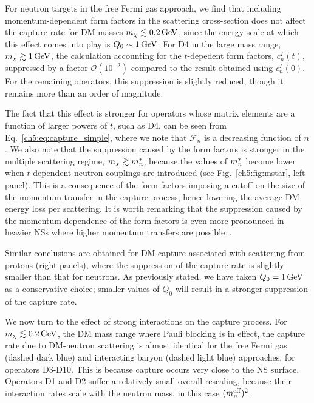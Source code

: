 For neutron targets in the free Fermi gas approach, we find that including momentum-dependent form factors in the scattering cross-section does not affect the capture rate for DM masses $m_\chi\lesssim0.2{\rm \,GeV}$, since the energy scale at which this effect comes into play is $Q_0\sim1{\rm \,GeV}$. For D4 in the large mass range, $m_\chi\gtrsim1{\rm \,GeV}$, the calculation accounting for the $t$-depedent form factors, $c_n^I(t)$, suppressed by a factor $\mathcal{O}(10^{-2})$ compared to the result obtained using $c_n^I(0)$.
For the remaining operators, this suppression is slightly reduced, though it remains more than an order of magnitude.

The fact that this effect is stronger for operators whose matrix elements are a function of larger powers of $t$, such as D4, can be seen from  Eq.~\ref{ch5:eq:capture_simple}, where we note that 
$\mathcal{F}_n$ is a decreasing function of $n$. 
We also note that the suppression caused by the form factors is stronger in the multiple scattering regime, $m_\chi\gtrsim m_n^*$, because the values of $m_n^*$ become lower when $t$-dependent neutron couplings are introduced (see Fig.~\ref{ch5:fig:mstar}, left panel). This is a consequence of the form factors imposing a cutoff on the 
size of the momentum transfer in the capture process, hence lowering the average DM energy loss per scattering. 
It is worth remarking that the suppression caused by the momentum dependence of the form factors is even more pronounced in heavier NSs where higher momentum transfers are possible~\cite{Bell:2020obw_sep_NucleonStructureStrong}. 

Similar conclusions are obtained for DM capture associated with scattering from protons (right panels), where the suppression of the capture rate is slightly smaller than that for neutrons. 
As previously stated, we have taken $Q_0=1{\rm \,GeV}$ as a conservative choice; smaller values of $Q_0$ will result in a stronger suppression of the capture rate. 


We now turn to the effect of strong interactions on the capture process. For $m_\chi\lesssim 0.2{\rm \,GeV}$, the DM mass range where Pauli blocking is in effect, the capture rate due to DM-neutron scattering is almost identical for the free Fermi gas (dashed dark blue) and interacting baryon (dashed light blue) approaches, for operators D3-D10. This is because capture occurs very close to the NS surface. Operators D1 and D2 suffer a relatively small overall rescaling, because their interaction rates scale with the neutron mass, in this case $(m_n^{\rm eff})^2$. 


